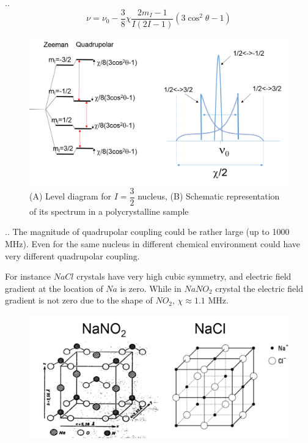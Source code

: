 \documentclass{beamer}
\begin{document}
\begin{frame}{\thesection.\thesubsection. \insertsubsection}
    	\begin{equation}
    	\nu = \nu_0 -\dfrac{3}{8} \chi \dfrac{2 m_I -1}{I(2I -1)}(3 \cos^2 \theta - 1)
    	\end{equation}
    	
    	\begin{figure}
    		\centering
    		\includegraphics[scale=0.4]{Quadrupole2.png}
    		\caption{(A) Level diagram for $I=\dfrac{3}{2}$ nucleus, (B) Schematic representation of its spectrum in a polycrystalline sample}
    	\end{figure}
\end{frame}

\begin{frame}{\thesection.\thesubsection. \insertsubsection}
	The magnitude of quadrupolar coupling could be rather large (up to 1000 MHz). Even for the same nucleus in different chemical environment could have very different quadrupolar coupling.
	
	For instance $NaCl$ crystals have very high cubic symmetry, and electric field gradient at the location of $Na$ is zero. While in $NaNO_2$ crystal the electric field gradient is not zero due to the shape of $NO_2$, $\chi \approx 1.1$ MHz.
	\begin{figure}
      \centering
      \includegraphics[scale=0.5]{Quadrupole3.png}
	\end{figure}
	
\end{frame}
\end{document}

